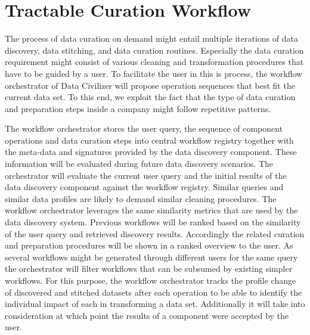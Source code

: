\section{Tractable Curation Workflow}
\label{sec:workflow}

The process of data curation on demand might entail multiple iterations of data discovery, data stitching, and data curation routines. Especially the data curation requirement might consist of various cleaning and transformation procedures that have to be guided by a user. 
To facilitate the user in this is process, the workflow orchestrator of Data Civilizer will propose operation sequences that best fit the current data set.
To this end, we exploit the fact that the type of data curation and preparation steps  inside a company might follow repetitive patterns.

The workflow orchestrator stores the user query, the sequence of component operations and data curation steps into central workflow registry together with the meta-data and signatures provided by the data discovery component.
These information will be evaluated during future data discovery scenarios. 
The orchestrator will evaluate the current user query and the initial results of the data discovery component against the workflow registry. Similar queries and similar data profiles are likely to demand similar cleaning procedures. The workflow orchestrator leverages the same similarity metrics that are used by the data discovery system.
Previous workflows will be ranked based on the similarity of the user query and retrieved discovery results. 
Accordingly the related curation and preparation procedures will be shown in a ranked overview to the user. 
As several workflows might be generated through different users for the same query the orchestrator will filter workflows that can be subsumed by existing simpler workflows. 
For this purpose, the workflow orchestrator tracks the profile change of discovered and stitched datasets after each operation to be able to identify the individual impact of each in transforming a data set. Additionally it will take into consideration at which point the results of a component were accepted by the user.
